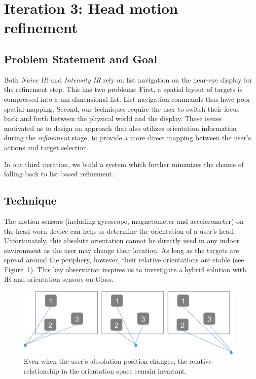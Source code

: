 \section{Iteration 3: Head motion refinement}
\label{sec:iteration-3:-head}
\subsection{Problem Statement and Goal}
Both {\em Naive IR} and {\em Intensity IR} rely on list navigation on the
near-eye display for the refinement step. This has two problems: First, a
spatial layout of targets is compressed into a uni-dimensional list. List
navigation commands thus have poor spatial mapping. Second, our techniques
require the user to switch their focus back and forth between the physical
world and the display. These issues motivated us to design an approach that
also utilizes orientation information during the {\em refinement} stage, to
provide a more direct mapping between the user's actions and target selection.

In our third iteration, we build a system which further minimizes the chance of
falling back to list based refinement.

\subsection{Technique}
The motion sensors (including gyroscope, magnetometer and accelerometer) on the
head-worn device can help us determine the orientation of a user's head.
Unfortunately, this absolute orientation cannot be directly used in any indoor
environment as the user may change their location. As long as the targets are
spread around the periphery, however, their relative orientations are stable
(see Figure~\ref{fig:third_principle}). This key observation inspires us to
investigate a hybrid solution with IR and orientation sensors on Glass.

\begin{figure}[t]
\centering
\includegraphics[width=1\columnwidth]{figures/third_principle.png}
\caption{Even when the user's absolution position changes, the relative relationship in the orientation space remain invariant.}
\label{fig:third_principle}
\end{figure}

